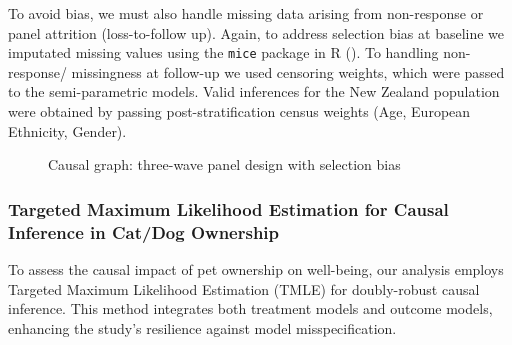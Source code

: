 \documentclass[
  singlecolumn,
  9pt]{article}
\begin{document}
To avoid bias, we must also handle missing data arising from
non-response or panel attrition (loss-to-follow up). Again, to address
selection bias at baseline we imputated missing values using the
\texttt{mice} package in R (). To handling non-response/ missingness at follow-up we used
censoring weights, which were passed to the semi-parametric models.
Valid inferences for the New Zealand population were obtained by passing
post-stratification census weights (Age, European Ethnicity, Gender).

\newpage{}

\begin{figure}


\caption{\label{fig-outcomewide-dag}Causal graph: three-wave panel
design with selection bias}

\end{figure}%

\newpage{}

\subsubsection{Targeted Maximum Likelihood Estimation for Causal
Inference in Cat/Dog
Ownership}\label{targeted-maximum-likelihood-estimation-for-causal-inference-in-catdog-ownership}

To assess the causal impact of pet ownership on well-being, our analysis
employs Targeted Maximum Likelihood Estimation (TMLE) for doubly-robust
causal inference. This method integrates both treatment models and
outcome models, enhancing the study's resilience against model
misspecification.
\end{document}
